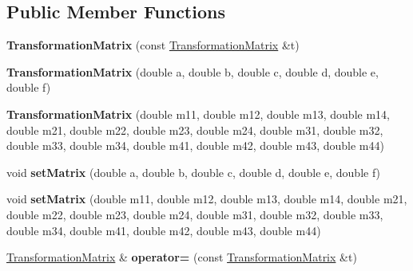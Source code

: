 \subsection*{Public Member Functions}
\begin{DoxyCompactItemize}
\item 
\mbox{\label{class_web_core_1_1_transformation_matrix_a0af3d2c1391e7be0b0cb1fc61281f597}} 
{\bfseries Transformation\+Matrix} (const \mbox{\hyperlink{class_web_core_1_1_transformation_matrix}{Transformation\+Matrix}} \&t)
\item 
\mbox{\label{class_web_core_1_1_transformation_matrix_a57058fb6c94c84b0921c416dd11542d1}} 
{\bfseries Transformation\+Matrix} (double a, double b, double c, double d, double e, double f)
\item 
\mbox{\label{class_web_core_1_1_transformation_matrix_a64cc30de371a6aae57c9a162977a0241}} 
{\bfseries Transformation\+Matrix} (double m11, double m12, double m13, double m14, double m21, double m22, double m23, double m24, double m31, double m32, double m33, double m34, double m41, double m42, double m43, double m44)
\item 
\mbox{\label{class_web_core_1_1_transformation_matrix_a0282cfc8d79f18e3af6b0cb63b0c2863}} 
void {\bfseries set\+Matrix} (double a, double b, double c, double d, double e, double f)
\item 
\mbox{\label{class_web_core_1_1_transformation_matrix_ae591912606d9e501ad82811d33c0bf16}} 
void {\bfseries set\+Matrix} (double m11, double m12, double m13, double m14, double m21, double m22, double m23, double m24, double m31, double m32, double m33, double m34, double m41, double m42, double m43, double m44)
\item 
\mbox{\label{class_web_core_1_1_transformation_matrix_ac0f59f7096750b393fe34b5a62e28182}} 
\mbox{\hyperlink{class_web_core_1_1_transformation_matrix}{Transformation\+Matrix}} \& {\bfseries operator=} (const \mbox{\hyperlink{class_web_core_1_1_transformation_matrix}{Transformation\+Matrix}} \&t)
\item 

\end{DoxyCompactItemize}
